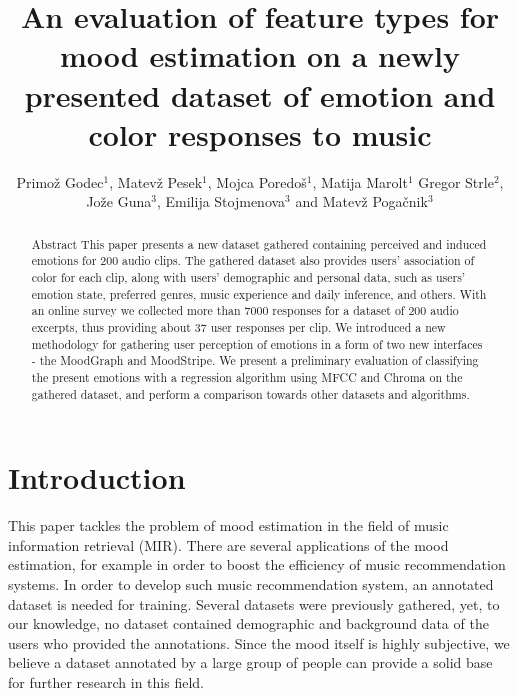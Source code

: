 \documentclass[a4paper]{article}
\begin{document}
\title{An evaluation of feature types for mood estimation on a newly presented dataset of emotion and color responses to music}

\author{Primož Godec$^{1}$, Matevž Pesek$^{1}$,  Mojca Poredoš$^{1}$, Matija Marolt$^{1}$ Gregor Strle$^{2}$,\\ Jože Guna$^{3}$, Emilija Stojmenova$^{3}$ and Matevž Pogačnik$^{3}$} %



\maketitle

\begin{abstract}{Abstract}
This paper presents a new dataset gathered containing perceived and induced emotions for 200 audio clips. The gathered dataset also provides users' association of color for each clip, along with users' demographic and personal data, such as users' emotion state, preferred genres, music experience and daily inference, and others. With an online survey we collected more than 7000 responses for a dataset of 200 audio excerpts, thus providing about 37 user responses per clip. We introduced a new methodology for gathering user perception of emotions in a form of two new interfaces - the MoodGraph and MoodStripe. We present a preliminary evaluation of classifying the present emotions with a regression algorithm using MFCC and Chroma on the gathered dataset, and perform a comparison towards other datasets and algorithms. 
\end{abstract}

\section{Introduction}

This paper tackles the problem of mood estimation in the field of music information retrieval (MIR). There are several applications of the mood estimation, for example in order to boost the efficiency of music recommendation systems. In order to develop such music recommendation system, an annotated dataset is needed for training. Several datasets were previously gathered, yet, to our knowledge, no dataset contained demographic and background data of the users who provided the annotations. Since the mood itself is highly subjective, we believe a dataset annotated by a large group of people can provide a solid base for further research in this field.
\end{document}
